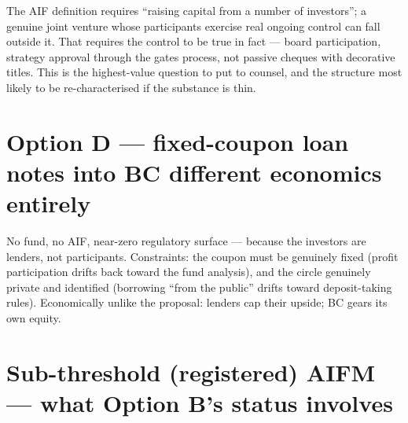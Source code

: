 \documentclass[11pt,a4paper]{article}
\begin{document}
The AIF definition requires ``raising capital from a number of investors'';
a genuine joint venture whose participants exercise real ongoing control can
fall outside it. That requires the control to be true in fact --- board
participation, strategy approval through the gates process, not passive
cheques with decorative titles. This is the highest-value question to put to
counsel, and the structure most likely to be re-characterised if the
substance is thin.

\section{Option D --- fixed-coupon loan notes into BC \hfill
  {\normalsize\color{bcgrey} different economics entirely}}

\begin{center}
\end{center}

No fund, no AIF, near-zero regulatory surface --- because the investors are
lenders, not participants. Constraints: the coupon must be genuinely fixed
(profit participation drifts back toward the fund analysis), and the circle
genuinely private and identified (borrowing ``from the public'' drifts toward
deposit-taking rules). Economically unlike the proposal: lenders cap their
upside; BC gears its own equity.

\section{Sub-threshold (registered) AIFM --- what Option B's status involves}
\end{document}
